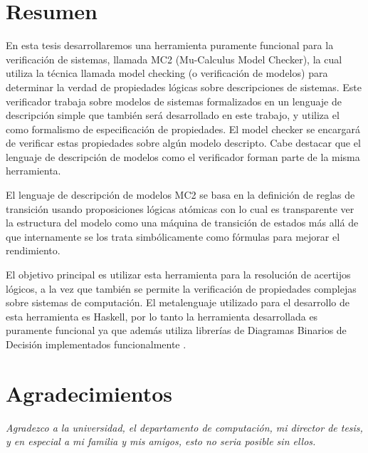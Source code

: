 % 
% 
%
\chapter*{Resumen}

\noindent En esta tesis desarrollaremos una herramienta puramente funcional para la verificación de sistemas, llamada MC2 (Mu-Calculus Model Checker), la cual utiliza la técnica llamada model checking (o verificación de modelos) para determinar la verdad de propiedades lógicas sobre descripciones de sistemas. Este verificador trabaja sobre modelos de sistemas formalizados en un lenguaje de descripción simple que también será desarrollado en este trabajo, y utiliza el {\mucalculo} como formalismo de especificación de propiedades. El model checker se encargará de verificar estas propiedades sobre algún modelo descripto. Cabe destacar que el lenguaje de descripción de modelos como el verificador forman parte de la misma herramienta.

\noindent El lenguaje de descripción de modelos MC2 se basa en la definición de reglas de transición usando proposiciones lógicas atómicas con lo cual es transparente ver la estructura del modelo como una máquina de transición de estados más allá de que internamente se los trata simbólicamente como fórmulas para mejorar el rendimiento.

\noindent El objetivo principal es utilizar esta herramienta para la resolución de acertijos lógicos, a la vez que también se permite la verificación de propiedades complejas sobre sistemas de computación. El metalenguaje utilizado para el desarrollo de esta herramienta es Haskell, por lo tanto la herramienta desarrollada es puramente funcional ya que además utiliza librerías de Diagramas Binarios de Decisión implementados funcionalmente \cite{Waldmann:6}.


\chapter*{Agradecimientos}
{\sl Agradezco a la universidad, el departamento de computación, mi director de tesis, y en especial a mi familia y mis amigos, esto no seria posible sin ellos.}

